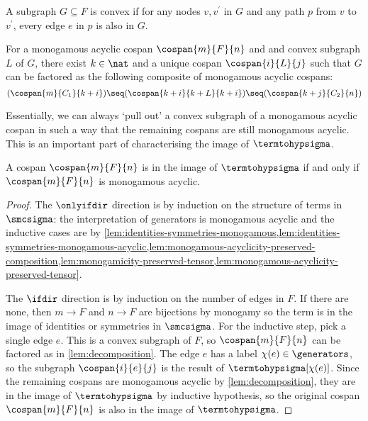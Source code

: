 \begin{definition}
    A subgraph \(G \subseteq F\) is convex if for any nodes \(v, v^\prime\) in
    \(G\) and any path \(p\) from \(v\) to \(v^\prime\), every edge \(e\) in
    \(p\) is also in \(G\).
\end{definition}

\begin{lemma}
    \label{lem:decomposition}
    For a monogamous acyclic cospan \(\cospan{m}{F}{n}\) and
    and convex subgraph \(L\) of \(G\), there exist
    \(k \in \nat\) and a unique cospan
    \(\cospan{i}{L}{j}\) such that \(G\) can be factored as
    the following composite of monogamous acyclic cospans:
    \[
        (\cospan{m}{C_1}{k + i})
        \seq
        (\cospan{
            k + i
        }{
            k + L
        }{
            k + i
        })
        \seq
        (\cospan{k + j}{C_2}{n})
    \]
\end{lemma}

Essentially, we can always `pull out' a convex subgraph of a monogamous acyclic
cospan in such a way that the remaining cospans are still monogamous acyclic.
This is an important part of characterising the image of \(\termtohypsigma\).

\begin{theorem}\label{thm:monogamous-acyclic-full}
    A cospan \(\cospan{m}{F}{n}\) is in the image of
    \(\termtohypsigma\) if and only if \(\cospan{m}{F}{n}\)
    is monogamous acyclic.
\end{theorem}
\begin{proof}
    The \(\onlyifdir\) direction is by induction on the structure of terms in
    \(\smcsigma\): the interpretation of generators is monogamous acyclic and
    the inductive cases are by
    \cref{lem:identities-symmetries-monogamous,lem:identities-symmetries-monogamous-acyclic,lem:monogamous-acyclicity-preserved-composition,lem:monogamicity-preserved-tensor,lem:monogamous-acyclicity-preserved-tensor}.

    The \(\ifdir\) direction is by induction on the number of edges in \(F\).
    If there are none, then \(m \to F\) and \(n \to F\) are
    bijections by monogamy so the term is in the image of
    identities or symmetries in \(\smcsigma\).
    For the inductive step, pick a single edge \(e\).
    This is a convex subgraph of \(F\), so
    \(\cospan{m}{F}{n}\) can be factored as in
    \cref{lem:decomposition}.
    The edge \(e\) has a label \(\chi(e) \in \generators\), so the subgraph
    \(\cospan{i}{e}{j}\) is the result of
    \(\termtohypsigma[\chi(e)]\).
    Since the remaining cospans are monogamous acyclic by
    \cref{lem:decomposition}, they are in the image of \(\termtohypsigma\) by
    inductive hypothesis, so the original cospan
    \(\cospan{m}{F}{n}\) is also in the image of
    \(\termtohypsigma\).
\end{proof}


